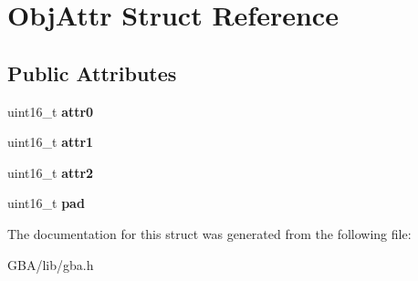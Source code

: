 \hypertarget{struct_obj_attr}{\section{Obj\-Attr Struct Reference}
\label{struct_obj_attr}
}
\subsection*{Public Attributes}
\begin{DoxyCompactItemize}
\item 
\hypertarget{struct_obj_attr_ab358a507b0ad6429e717941068d64f76}{uint16\-\_\-t {\bfseries attr0}}\label{struct_obj_attr_ab358a507b0ad6429e717941068d64f76}

\item 
\hypertarget{struct_obj_attr_a86d659f745500f46f239d21a24b6ff3c}{uint16\-\_\-t {\bfseries attr1}}\label{struct_obj_attr_a86d659f745500f46f239d21a24b6ff3c}

\item 
\hypertarget{struct_obj_attr_a43d6d720a9f684dbb0c23318ea9ce2ea}{uint16\-\_\-t {\bfseries attr2}}\label{struct_obj_attr_a43d6d720a9f684dbb0c23318ea9ce2ea}

\item 
\hypertarget{struct_obj_attr_a4ce5fb46cf75eea5d97d939afe090802}{uint16\-\_\-t {\bfseries pad}}\label{struct_obj_attr_a4ce5fb46cf75eea5d97d939afe090802}

\end{DoxyCompactItemize}


The documentation for this struct was generated from the following file\-:\begin{DoxyCompactItemize}
\item 
G\-B\-A/lib/gba.\-h\end{DoxyCompactItemize}
